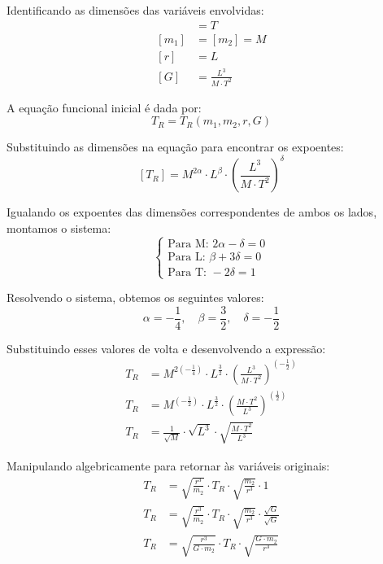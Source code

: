 
\vspace{0.5cm}
\noindent Identificando as dimensões das variáveis envolvidas:
\begin{align*}
[T_{R}] &= T \\
[m_{1}] &= [m_{2}] = M \\
[r] &= L \\
[G] &= \frac{L^{3}}{M \cdot T^{2}}
\end{align*}

\noindent A equação funcional inicial é dada por:
\[ T_{R} = T_{R}(m_{1}, m_{2}, r, G) \]

\noindent Substituindo as dimensões na equação para encontrar os expoentes:
\[ [T_{R}] = M^{2\alpha} \cdot L^{\beta} \cdot \left(\frac{L^{3}}{M \cdot T^{2}}\right)^{\delta} \]

\noindent Igualando os expoentes das dimensões correspondentes de ambos os lados, montamos o sistema:
\[
\begin{cases}
\text{Para M: } 2\alpha - \delta = 0 \\
\text{Para L: } \beta + 3\delta = 0 \\
\text{Para T: } -2\delta = 1
\end{cases}
\]

\noindent Resolvendo o sistema, obtemos os seguintes valores:
\[ \alpha = -\frac{1}{4}, \quad \beta = \frac{3}{2}, \quad \delta = -\frac{1}{2} \]

\noindent Substituindo esses valores de volta e desenvolvendo a expressão:
\begin{align*}
T_{R} &= M^{2\left(-\frac{1}{4}\right)} \cdot L^{\frac{3}{2}} \cdot \left(\frac{L^{3}}{M \cdot T^{2}}\right)^{\left(-\frac{1}{2}\right)} \\
T_{R} &= M^{\left(-\frac{1}{2}\right)} \cdot L^{\frac{3}{2}} \cdot \left(\frac{M \cdot T^{2}}{L^{3}}\right)^{\left(\frac{1}{2}\right)} \\
T_{R} &= \frac{1}{\sqrt{M}} \cdot \sqrt{L^{3}} \cdot \sqrt{\frac{M \cdot T^{2}}{L^{3}}}
\end{align*}

\noindent Manipulando algebricamente para retornar às variáveis originais:
\begin{align*}
T_{R} &= \sqrt{\frac{r^{3}}{m_{2}}} \cdot T_{R} \cdot \sqrt{\frac{m_{2}}{r^{3}}} \cdot 1 \\
T_{R} &= \sqrt{\frac{r^{3}}{m_{2}}} \cdot T_{R} \cdot \sqrt{\frac{m_{2}}{r^{3}}} \cdot \frac{\sqrt{G}}{\sqrt{G}} \\
T_{R} &= \sqrt{\frac{r^{3}}{G \cdot m_{2}}} \cdot T_{R} \cdot \sqrt{\frac{G \cdot m_{2}}{r^{3}}}
\end{align*}
